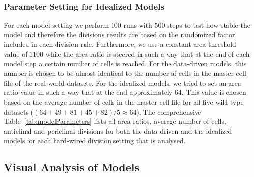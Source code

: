 \documentclass[11pt,a4paper, final]{article}
\begin{document}
\subsubsection{Parameter Setting for Idealized Models}
\noindent
For each model setting we perform $100$ runs with $500$ steps to test how stable the model and therefore the divisions results are based on the randomized factor included in each division rule. Furthermore, we use a constant area threshold value of $1100$ while the area ratio is steered in such a way that at the end of each model step a certain number of cells is reached. For the data-driven models, this number is chosen to be almost identical to the number of cells in the master cell file of the real-world datasets. For the idealized models, we tried to set an area ratio value in such a way that at the end approximately $64$. This value is chosen based on the average number of cells in the master cell file for all five wild type datasets ($(64+49+81+45+82)/5 \approx 64$). The comprehensive Table~\ref{tab:modelParameters} lists all area ratios, average number of cells, anticlinal and periclinal divisions for both the data-driven and the idealized models for each hard-wired division setting that is analysed.

\subsection{Visual Analysis of Models}
\end{document}
